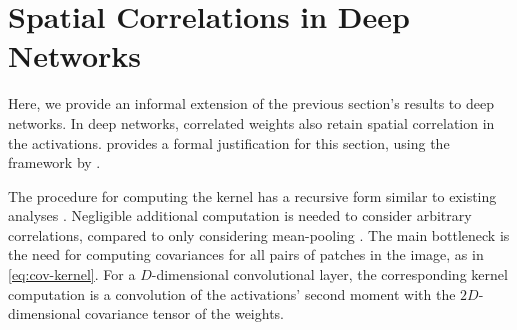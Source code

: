 \documentclass[accepted]{uai2021} %
\newcommand{\0}{\boldsymbol{0}}
\newcommand{\1}{\boldsymbol{1}}
\begin{document}




\section{Spatial Correlations in Deep Networks}
\label{sec:deep-correlations}
Here, we provide an informal extension of the previous section's results to deep networks.
In deep networks, correlated weights also retain spatial correlation in the activations.
 provides a formal justification for this section, using the framework by \citet{yang2019wide}.

The procedure for computing the kernel has a recursive form similar to existing analyses \citep{garriga2018infiniteconv,novak2019infiniteconv}. Negligible additional computation is needed to consider arbitrary correlations, compared to only considering mean-pooling \citep{novak2019infiniteconv,arora2019exact}. The main bottleneck is the need for computing covariances for all pairs of patches in the image, as in \cref{eq:cov-kernel}. For a $D$-dimensional convolutional layer, the corresponding kernel computation is a convolution of the activations' second moment with the
$2D$-dimensional covariance tensor of the weights.
\end{document}
